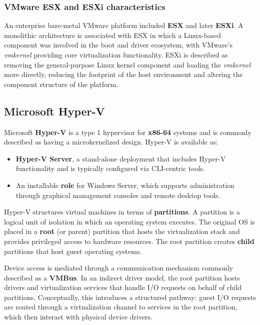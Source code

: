\documentclass[11pt,a4paper,openany]{report}
\begin{document}
\subsubsection*{VMware ESX and ESXi characteristics}

An enterprise bare-metal VMware platform included \textbf{ESX} and later \textbf{ESXi}. A monolithic architecture is associated with ESX in which a Linux-based component was involved in the boot and driver ecosystem, with VMware's \emph{vmkernel} providing core virtualization functionality. ESXi is described as removing the general-purpose Linux kernel component and loading the \emph{vmkernel} more directly, reducing the footprint of the host environment and altering the component structure of the platform.

\subsection{Microsoft Hyper-V}

Microsoft \textbf{Hyper-V} is a type 1 hypervisor for \textbf{x86-64} systems and is commonly described as having a microkernelized design. Hyper-V is available as:

\begin{itemize}
\item \textbf{Hyper-V Server}, a stand-alone deployment that includes Hyper-V functionality and is typically configured via CLI-centric tools.
\item An installable \textbf{role} for Windows Server, which supports administration through graphical management consoles and remote desktop tools.
\end{itemize}

Hyper-V structures virtual machines in terms of \textbf{partitions}. A partition is a logical unit of isolation in which an operating system executes. The original OS is placed in a \textbf{root} (or parent) partition that hosts the virtualization stack and provides privileged access to hardware resources. The root partition creates \textbf{child} partitions that host guest operating systems.

Device access is mediated through a communication mechanism commonly described as a \textbf{VMBus}. In an indirect driver model, the root partition hosts drivers and virtualization services that handle I/O requests on behalf of child partitions. Conceptually, this introduces a structured pathway: guest I/O requests are routed through a virtualization channel to services in the root partition, which then interact with physical device drivers.
\end{document}

